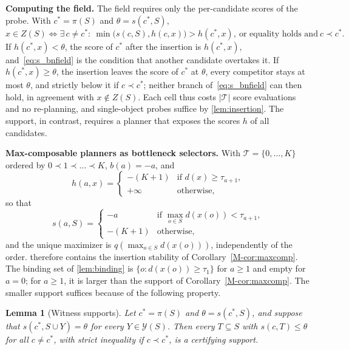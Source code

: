 \documentclass[10pt,letterpaper]{article}
\newcommand{\field}{Z}
\newcommand{\policy}{\pi}
\newcommand{\dem}{d}
\newtheorem{lemma}{Lemma}
\theoremstyle{remark}
\theoremstyle{plain}
\theoremstyle{definition}
\newcommand{\mrefnum}[1]{\ref*{M-#1}}
\begin{document}
\textbf{Computing the field.}
The field requires only the per-candidate scores of the probe.
With $c^\ast=\policy(S)$ and $\theta=s(c^\ast,S)$,
\begin{equation}
x\in\field(S)\iff\exists\,c\neq c^\ast:\ \min\big(s(c,S),h(c,x)\big)>h(c^\ast,x),\ \text{or equality holds and}\ c\prec c^\ast.
\label{eq:s_bnfield}
\end{equation}
If $h(c^\ast,x)<\theta$, the score of $c^\ast$ after the insertion is $h(c^\ast,x)$, and~\cref{eq:s_bnfield} is the condition that another candidate overtakes it.
If $h(c^\ast,x)\ge\theta$, the insertion leaves the score of $c^\ast$ at $\theta$, every competitor stays at most $\theta$, and strictly below it if $c\prec c^\ast$; neither branch of~\cref{eq:s_bnfield} can then hold, in agreement with $x\notin\field(S)$.
Each cell thus costs $|\mathcal{T}|$ score evaluations and no re-planning, and single-object probes suffice by \cref{lem:insertion}.
The support, in contrast, requires a planner that exposes the scores $h$ of all candidates.

\textbf{Max-composable planners as bottleneck selectors.}
With $\mathcal{T}=\{0,\dots,K\}$ ordered by $0\prec1\prec\dots\prec K$, $b(a)=-a$, and
\begin{equation}
h(a,x)=\begin{cases}-(K{+}1) & \text{if }\dem(x)\ge\tau_{a+1},\\ +\infty & \text{otherwise,}\end{cases}
\end{equation}
so that
\begin{equation}
s(a,S)=\begin{cases}-a & \text{if }\max_{o\in S}\dem(x(o))<\tau_{a+1},\\ -(K{+}1) & \text{otherwise,}\end{cases}
\end{equation}
and
the unique maximizer is $q(\max_{o\in S}\dem(x(o)))$, independently of the order.
 therefore contains the insertion stability of Corollary~\mrefnum{cor:maxcomp}.
The binding set of \cref{lem:binding} is $\{o:\dem(x(o))\ge\tau_1\}$ for $a\ge1$ and empty for $a=0$; for $a\ge1$, it is larger than the support of Corollary~\mrefnum{cor:maxcomp}.
The smaller support suffices because of the following property.

\begin{lemma}[Witness supports]
\label{lem:witness}
Let $c^\ast=\policy(S)$ and $\theta=s(c^\ast,S)$, and suppose that $s(c^\ast,S\cup Y)=\theta$ for every $Y\in\mathcal{Y}(S)$.
Then every $T\subseteq S$ with $s(c,T)\le\theta$ for all $c\neq c^\ast$, with strict inequality if $c\prec c^\ast$, is a certifying support.
\end{lemma}
\end{document}
